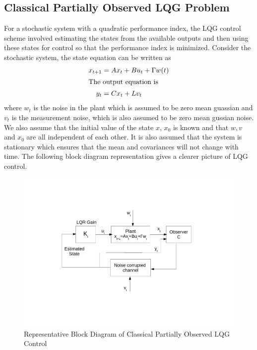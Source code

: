 \documentclass[a4paper,12pt]{article}
\begin{document}
	\subsection{Classical Partially Observed LQG Problem}
	For a stochastic system with a quadratic performance index, the LQG control scheme involved estimating the states from the available outputs and then using these states for control so that the performance index is minimized. Consider the stochastic system, the state equation can be written as
	\begin{align}
	x_{t+1} &= Ax_{t}+ Bu_{t} + \Gamma w(t)\\
	\intertext{The output equation is}
	y_{t}&=Cx_{t}+Lv_{t}
	\end{align}
	where $w_{t}$ is the noise in the plant which is assumed to be zero mean guassian and $v_{t}$ is the measurement noise, which is also assumed to be zero mean gussian noise. We also assume that the initial value of the state $x$, $x_{0}$ is known and that $w,v$ and $x_{0}$ are all independent of each other. It is also assumed that the system is stationary which ensures that the mean and covariances will not change with time. The following block diagram representation gives a clearer picture of LQG control.
	\begin{figure}[H]

			  \centering
%			  
			\includegraphics[scale=0.5]{lqg_block}
			  \caption{Representative Block Diagram of Classical Partially Observed LQG Control}
			 \label{lqg}
		\end{figure}	
	
\end{document}

